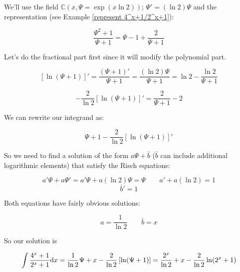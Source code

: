 We'll use the field ${\mathbb C}(x,\Psi = \exp(x \ln 2))$; $\Psi' =
(\ln 2)\Psi$ and the representation (see Example
\ref{represent 4^x+1/2^x+1}):

$$ \frac{\Psi^2+1}{\Psi+1} = \Psi-1+\frac{2}{\Psi+1}$$

Let's do the fractional part first since it will modify the polynomial
part.

$$\left[\ln(\Psi+1)\right]' = \frac{(\Psi + 1)'}{\Psi+1} = \frac{(\ln
2)\Psi}{\Psi + 1} = \ln 2 - \frac{\ln 2}{\Psi+1}$$

$$-\frac{2}{\ln 2}\left[\ln(\Psi+1)\right]' = \frac{2}{\Psi+1} - 2$$

We can rewrite our integrand as:

$$ \Psi + 1 - \frac{2}{\ln 2}\left[\ln(\Psi+1)\right]'$$

So we need to find a solution of the form $a\Psi + \bar{b}$ ($\bar{b}$
can include additional logarithmic elements) that satisfy the Risch
equations:

$$a'\Psi + a\Psi' = a'\Psi + a(\ln 2)\Psi = \Psi \qquad a' + a(\ln 2) = 1$$
$$\bar{b}' = 1$$

Both equations have fairly obvious solutions:

$$a = \frac{1}{\ln 2} \qquad \bar{b}=x$$

So our solution is

$$\int {{4^x+1}\over{2^x+1}} {\rm d}x = \frac{1}{\ln 2}\Psi + x  - \frac{2}{\ln 2}\left[\ln(\Psi+1)\right] =
\frac{2^x}{\ln 2} + x - \frac{2}{\ln 2}\ln(2^x+1) $$

\endexample
